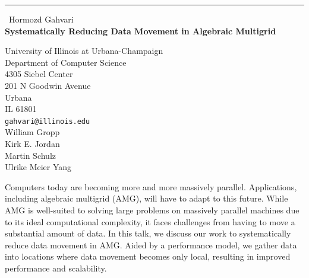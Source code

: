 \documentclass{report}
\begin{document}
\begin{center}
\rule{6in}{1pt} \
{\large Hormozd Gahvari \\
{\bf Systematically Reducing Data Movement in Algebraic Multigrid}}

University of Illinois at Urbana-Champaign \\ Department of Computer Science \\ 4305 Siebel Center \\ 201 N Goodwin Avenue \\ Urbana \\ IL 61801
\\
{\tt gahvari@illinois.edu}\\
William Gropp\\
Kirk E. Jordan\\
Martin Schulz\\
Ulrike Meier Yang\end{center}

Computers today are becoming more and more massively parallel.
Applications, including algebraic multigrid (AMG), will have to adapt to
this future. While AMG is well-suited to solving large problems on
massively parallel machines due to its ideal computational complexity, it
faces challenges from having to move a substantial amount of data. In
this talk, we discuss our work to systematically reduce data movement in
AMG. Aided by a performance model, we gather data into locations where
data movement becomes only local, resulting in improved performance and
scalability.
\end{document}
